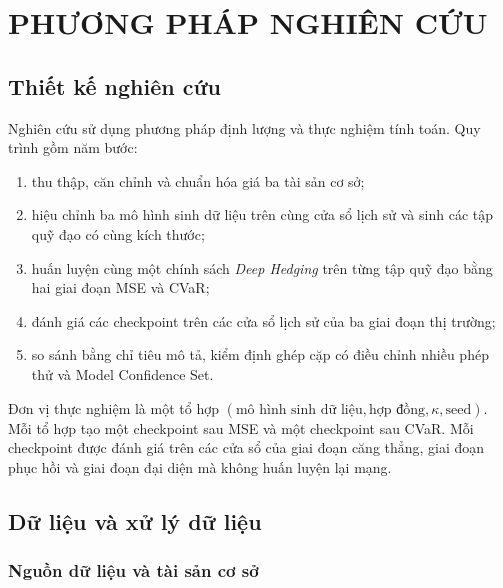 
\chapter{PHƯƠNG PHÁP NGHIÊN CỨU}
\label{chap:phuong-phap}

\section{Thiết kế nghiên cứu}
\label{sec:c3-design}

Nghiên cứu sử dụng phương pháp định lượng và thực nghiệm tính toán. Quy trình
gồm năm bước:
\begin{enumerate}[label=(\arabic*)]
    \item thu thập, căn chỉnh và chuẩn hóa giá ba tài sản cơ sở;
    \item hiệu chỉnh ba mô hình sinh dữ liệu trên cùng cửa sổ lịch sử và sinh các tập quỹ
    đạo có cùng kích thước;
    \item huấn luyện cùng một chính sách \textit{Deep Hedging} trên từng tập
    quỹ đạo bằng hai giai đoạn MSE và CVaR;
    \item đánh giá các checkpoint trên các cửa sổ lịch sử của ba giai đoạn thị
    trường;
    \item so sánh bằng chỉ tiêu mô tả, kiểm định ghép cặp có điều chỉnh nhiều
    phép thử và Model Confidence Set.
\end{enumerate}

Đơn vị thực nghiệm là một tổ hợp
$(\text{mô hình sinh dữ liệu},\text{hợp đồng},\kappa,\text{seed})$. Mỗi tổ hợp
tạo một checkpoint sau MSE và một checkpoint sau CVaR. Mỗi checkpoint được
đánh giá trên các cửa sổ của giai đoạn căng thẳng, giai đoạn phục hồi và giai
đoạn đại diện mà không huấn luyện lại mạng.

\section{Dữ liệu và xử lý dữ liệu}
\label{sec:c3-data}

\subsection{Nguồn dữ liệu và tài sản cơ sở}

